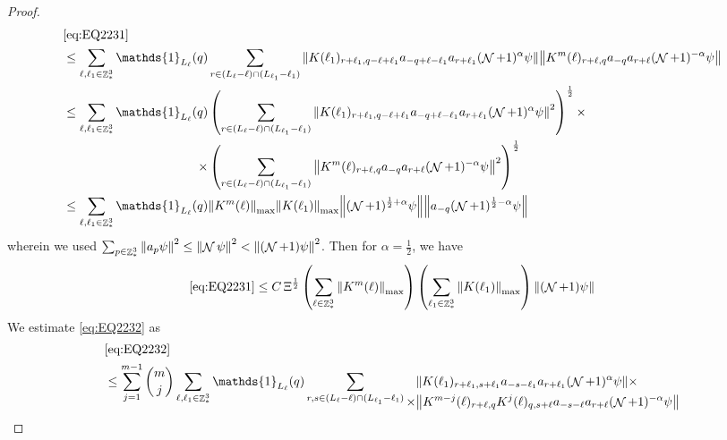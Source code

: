 \documentclass[sn-mathphys, Numbered ,a4paper]{sn-jnl}%
\DeclareMathOperator{\Z}{\mathbb{Z}}
\DeclareMathOperator{\NN}{\mathcal{N}}
\newcommand{\half}{\frac{1}{2}}
\theoremstyle{plain}
\theoremstyle{definition}
\theoremstyle{remark}
\theoremstyle{plain}
\theoremstyle{definition}
\theoremstyle{remark}
\begin{document}
\begin{proof}
	\begin{align}
		&\eqref{eq:EQ2231}\nonumber\\
		&\leq \sum\limits_{\ell, \ell_1\in \Z^3_*} \mathds{1}_{L_{\ell}}(q)  \sum\limits_{r\in(L_{\ell}-\ell) \cap (L_{\ell_1}-\ell_1)} \norm{ K(\ell_1)_{r+\ell_1,q-\ell+\ell_1} a_{-q+\ell-\ell_1} a_{r+\ell_1}(\NN+1)^{\alpha}\psi}\norm{ K^m(\ell)_{r+\ell,q} a_{-q}a_{r+\ell} (\NN+1)^{-\alpha} \psi }\nonumber\\
		&\leq \sum\limits_{\ell, \ell_1\in \Z^3_*} \begin{aligned}[t] \mathds{1}_{L_{\ell}}(q)  &\left(\sum\limits_{r\in(L_{\ell}-\ell) \cap (L_{\ell_1}-\ell_1)} \norm{ K(\ell_1)_{r+\ell_1,q-\ell+\ell_1} a_{-q+\ell-\ell_1} a_{r+\ell_1} (\NN+1)^{\alpha}\psi}^2 \right)^\half \times \nonumber\\ \times &\left(\sum\limits_{r\in(L_{\ell}-\ell) \cap (L_{\ell_1}-\ell_1)} \norm{ K^m(\ell)_{r+\ell,q} a_{-q}a_{r+\ell} (\NN+1)^{-\alpha} \psi }^2\right)^\half \end{aligned}\nonumber\\
		&\leq \sum\limits_{\ell, \ell_1\in \Z^3_*} \mathds{1}_{L_{\ell}}(q)   \norm{K^m(\ell)}_{\mathrm{max}} \norm{ K(\ell_1)}_{\mathrm{max}} \norm{ (\NN+1)^{\half+\alpha}\psi}\norm{ a_{-q} (\NN+1)^{\half-\alpha} \psi }\nonumber\\
	\end{align} 
	wherein we used $\sum_{p\in \Z^3_*}\norm{a_p \psi}^2\leq\norm{\NN\psi}^2<\norm{(\NN+1)\psi}^2$. Then for $\alpha =  \half $, we have 
	\begin{equation}
		\eqref{eq:EQ2231}\leq C\, \Xi^\half \left(\sum\limits_{\ell\in \Z^3_*} \norm{K^m(\ell)}_{\mathrm{max}}\right)\left(  \sum\limits_{ \ell_1\in \Z^3_*}  \norm{ K(\ell_1)}_{\mathrm{max}} \right) \norm{ (\NN+1) \psi}\label{eq:estEQ2231} 
	\end{equation}  
	We estimate \eqref{eq:EQ2232} as
	\begin{align}
		&\eqref{eq:EQ2232}\nonumber\\
		&\leq \sum\limits_{j=1}^{m-1} {{m}\choose j} \sum\limits_{\ell, \ell_1\in \Z^3_*}\mathds{1}_{L_{\ell}}(q) \sum\limits_{r, s \in (L_{\ell}-\ell) \cap (L_{\ell_1}-\ell_1)} \begin{aligned}[t] &\norm{ K(\ell_1)_{r+\ell_1,s+\ell_1}a_{-s-\ell_1} a_{r+\ell_1} (\NN+1)^{\alpha}\psi}\nonumber \times \\ \times&\norm{ K^{m-j}(\ell)_{r+\ell,q} K^{j}(\ell)_{q,s+\ell} a_{-s-\ell}a_{r+\ell} (\NN+1)^{-\alpha} \psi }\end{aligned} \nonumber\\

\end{align}
\end{proof}
\end{document}
